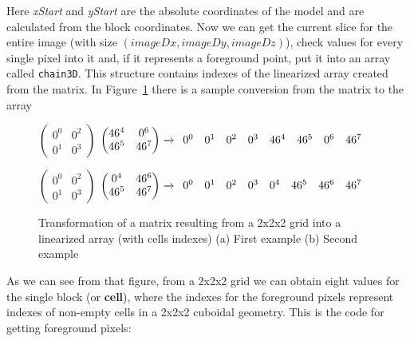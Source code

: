 \documentclass[11pt,oneside]{article}	%
\begin{document}
Here \textit{xStart} and \textit{yStart} are the absolute coordinates of the model and are calculated from the block coordinates. Now we can get the current slice for the entire image (with size $(imageDx, imageDy, imageDz)$), check values for every single pixel into it and, if it represents a foreground point, put it into an array called \texttt{chain3D}. This structure contains indexes of the linearized array created from the matrix. In Figure~\ref{fig:linearizedMatrix} there is a sample conversion from the matrix to the array

\begin{figure}[htb] %
   \centering
    $
    \begin{pmatrix}
    0^{0} & 0^{2}\\
    0^{1} & 0^{3}
    \end{pmatrix}
    $
    $
    \begin{pmatrix}
    46^{4} & 0^{6}\\
    46^{5} & 46^{7}
    \end{pmatrix}
    \xrightarrow{}
    \begin{array}{c c c c c c c c}
      0^{0} & 0^{1} & 0^{2} & 0^{3} & 46^{4}  & 46^{5} & 0^{6} & 46^{7} \\
    \end{array}
    $
    
    $
    \begin{pmatrix}
    0^{0} & 0^{2}\\
    0^{1} & 0^{3}
    \end{pmatrix}
    $
    $
   \begin{pmatrix}
    0^{4} & 46^{6}\\
    46^{5} & 46^{7}
    \end{pmatrix}
    \xrightarrow{}
    \begin{array}{c c c c c c c c}
      0^{0} & 0^{1} & 0^{2} & 0^{3} & 0^{4}  & 46^{5} & 46^{6} & 46^{7} \\
    \end{array}
    $
   \hfill
   \caption{Transformation of a matrix resulting from a 2x2x2 grid into a linearized array (with cells indexes) (a) First example (b) Second example}
   \label{fig:linearizedMatrix}
\end{figure}

As we can see from that figure, from a 2x2x2 grid we can obtain eight values for the single block (or \textbf{cell}), where the indexes for the foreground pixels represent indexes of non-empty cells in a 2x2x2 cuboidal geometry.
This is the code for getting foreground pixels:
\end{document}
